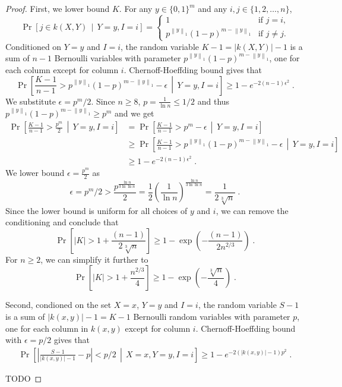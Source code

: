 \documentclass[10pt]{article}
\newcommand{\norm}[1]{\left\| #1 \right\|}
\begin{document}
\begin{proof}
First, we lower bound $K$. For any $y \in \{0,1\}^m$ and any $i,j \in \{1,2,\dots,n\}$,
$$
\Pr \left[ j \in k(X,Y)  \, \middle| \, Y = y, I = i \right]
=
\begin{cases}
1 & \text{if $j = i$,} \\
p^{\norm{y}_1} (1 - p)^{m - \norm{y}_1} & \text{if $j \neq j$.}
\end{cases}
$$
Conditioned on $Y = y$ and $I=i$, the random variable $K - 1 = |k(X,Y)| - 1$ is
a sum of $n-1$ Bernoulli variables with parameter $p^{\norm{y}_1} (1 - p)^{m - \norm{y}_1}$, one for each column except for column $i$.
Chernoff-Hoeffding bound gives that
$$
\Pr \left[ \frac{K - 1}{n - 1} > p^{\norm{y}_1} (1 - p)^{m - \norm{y}_1} - \epsilon \, \middle| \,  Y = y, I = i  \right] \ge 1 - e^{-2(n-1) \epsilon^2} \; .
$$
We substitute $\epsilon = p^m/2$. Since $n \ge 8$, $p = \frac{1}{\ln n} \le 1/2$ and thus $p^{\norm{y}_1} (1 -
p)^{m - \norm{y}_1} \ge p^m$ and we get
\begin{align*}
\Pr \left[ \frac{K - 1}{n - 1} > \frac{p^m}{2}  \, \middle| \,  Y = y, I = i  \right]
& = \Pr \left[ \frac{K - 1}{n - 1} > p^m - \epsilon  \, \middle| \,  Y = y, I = i  \right] \\
& \ge \Pr \left[ \frac{K - 1}{n - 1} > p^{\norm{y}_1} (1 - p)^{m - \norm{y}_1} - \epsilon  \, \middle| \,  Y = y, I = i  \right] \\
& \ge 1 - e^{-2(n-1) \epsilon^2} \; .
\end{align*}
We lower bound $\epsilon = \frac{p^m}{2}$ as
$$
\epsilon = p^m/2 > \frac{p^\frac{\ln n}{3 \ln \ln n}}{2} = \frac{1}{2} \left( \frac{1}{\ln n} \right)^\frac{\ln n}{3 \ln \ln n} = \frac{1}{2\sqrt[3]{n}} \; .
$$
Since the lower bound is uniform for all choices of $y$ and $i$, we can remove
the conditioning and conclude that
$$
\Pr \left[ |K| > 1 + \frac{(n-1)}{2\sqrt[3]{n}} \right] \ge 1 - \exp \left(- \frac{(n-1)}{2 n^{2/3}} \right) \; .
$$
For $n \ge 2$, we can simplify it further to
$$
\Pr \left[ |K| > 1 + \frac{n^{2/3}}{4} \right] \ge 1 - \exp \left(- \frac{\sqrt[3]{n}}{4} \right) \; .
$$

Second, condioned on the set $X=x$, $Y=y$ and $I=i$, the random variable $S - 1$
is a sum of $|k(x,y)|-1 = K - 1$ Bernoulli random variables with parameter $p$,
one for each column in $k(x,y)$ except for column $i$. Chernoff-Hoeffding bound with $\epsilon = p/2$
gives that
\begin{align*}
\Pr \left[ \left| \frac{S - 1}{|k(x,y)| - 1} - p \right| < p/2  \, \middle| \, X = x, Y = y, I = i  \right] \ge 1 - e^{-2 (|k(x,y)| - 1) p^2} \; .
\end{align*}

TODO

\end{proof}
\end{document}
